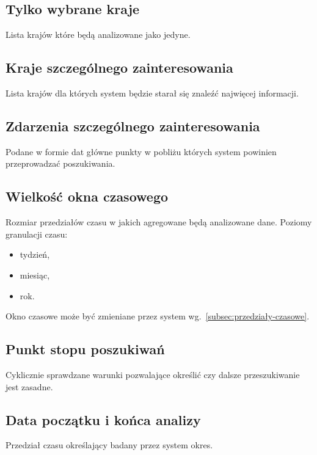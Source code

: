 \documentclass[11pt]{report}
\begin{document}
    \subsection{Tylko wybrane kraje}
    Lista krajów które będą analizowane jako jedyne.

    \subsection{Kraje szczególnego zainteresowania}
    Lista krajów dla których system będzie starał się znaleźć najwięcej informacji.

    \subsection{Zdarzenia szczególnego zainteresowania}
    Podane w formie dat główne punkty w pobliżu których system powinien przeprowadzać poszukiwania.

    \subsection{Wielkość okna czasowego}
    Rozmiar przedziałów czasu w jakich agregowane będą analizowane dane.
    Poziomy granulacji czasu:
    \begin{itemize}
        \item tydzień,
        \item miesiąc,
        \item rok.
    \end{itemize}
    Okno czasowe może być zmieniane przez system wg.~\ref{subsec:przedziały-czasowe}.

    \subsection{Punkt stopu poszukiwań}
    Cyklicznie sprawdzane warunki pozwalające określić czy dalsze przeszukiwanie jest zasadne.

    \subsection{Data początku i końca analizy}
    Przedział czasu określający badany przez system okres.
\end{document}

